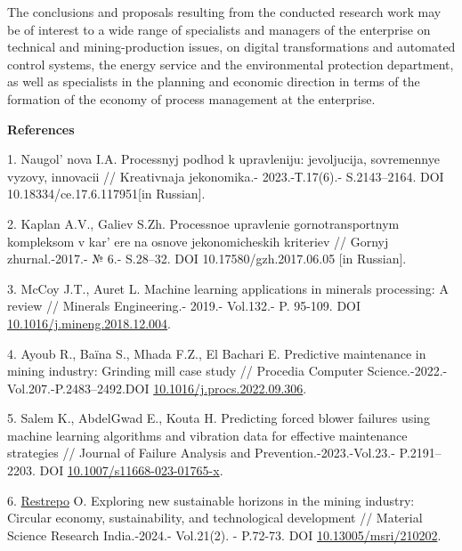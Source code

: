 \begin{multicols}{2}
The conclusions and proposals resulting from the conducted research work
may be of interest to a wide range of specialists and managers of the
enterprise on technical and mining-production issues, on digital
transformations and automated control systems, the energy service and
the environmental protection department, as well as specialists in the
planning and economic direction in terms of the formation of the economy
of process management at the enterprise.
\end{multicols}

\begin{center}
{\bfseries References}
\end{center}

\begin{references}
1. Naugol' nova I.A. Processnyj podhod k upravleniju:
jevoljucija, sovremennye vyzovy, innovacii // Kreativnaja jekonomika.-
2023.-Т.17(6).- S.2143--2164. DOI 10.18334/ce.17.6.117951{[}in
Russian{]}.

2. Kaplan A.V., Galiev S.Zh. Processnoe upravlenie gornotransportnym
kompleksom v kar' ere na osnove jekonomicheskih
kriteriev // Gornyj zhurnal.-2017.- № 6.- S.28--32.
DOI 10.17580/gzh.2017.06.05 {[}in Russian{]}.

3. McCoy J.T., Auret L. Machine learning applications in minerals
processing: A review // Minerals Engineering.- 2019.- Vol.132.- P.
95-109. DOI
\href{https://doi.org/10.1016/j.mineng.2018.12.004}{10.1016/j.mineng.2018.12.004}.

4. Ayoub R., Baïna S., Mhada F.Z., El Bachari E. Predictive maintenance
in mining industry: Grinding mill case study // Procedia Computer
Science.-2022.-Vol.207.-P.2483--2492.DOI
\href{https://doi.org/10.1016/j.procs.2022.09.306}{10.1016/j.procs.2022.09.306}.

5. Salem K., AbdelGwad E., Kouta H. Predicting forced blower failures
using machine learning algorithms and vibration data for effective
maintenance strategies // Journal of Failure Analysis and
Prevention.-2023.-Vol.23.- P.2191--2203. DOI
\href{http://dx.doi.org/10.1007/s11668-023-01765-x}{10.1007/s11668-023-01765-x}.

6. \href{https://www.researchgate.net/profile/Oscar-Restrepo-6?_tp=eyJjb250ZXh0Ijp7ImZpcnN0UGFnZSI6InB1YmxpY2F0aW9uIiwicGFnZSI6InB1YmxpY2F0aW9uIn19}{Restrepo}
O. Exploring new sustainable horizons in the mining industry: Circular
economy, sustainability, and technological development // Material
Science Research India.-2024.- Vol.21(2). - P.72-73. DOI
\href{http://dx.doi.org/10.13005/msri/210202}{10.13005/msri/210202}.


\end{references}
